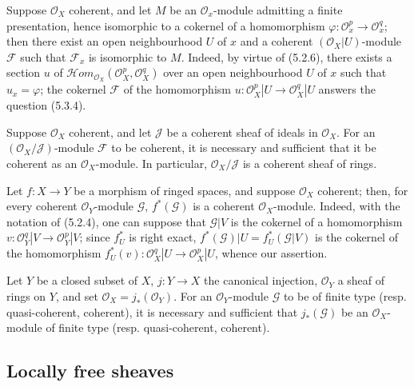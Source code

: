 \begin{env}[5.3.9]
\label{0.5.3.9}
Suppose $\mathcal{O}_X$ coherent, and let $M$ be an $\mathcal{O}_x$-module
admitting a finite presentation, hence isomorphic to a cokernel of a
homomorphism $\varphi:\mathcal{O}_x^p\to\mathcal{O}_x^q$; then there exist an
open neighbourhood $U$ of $x$ and a coherent $(\mathcal{O}_X|U)$-module
$\mathcal{F}$ such that $\mathcal{F}_x$ is isomorphic to $M$. Indeed, by virtue
of (5.2.6), there exists a section $u$ of
$\mathcal{H}\!om_{\mathcal{O}_X}(\mathcal{O}_X^p,\mathcal{O}_X^q)$ over
an open neighbourhood $U$ of $x$ such that $u_x=\varphi$; the cokernel
$\mathcal{F}$ of the homomorphism
$u:\mathcal{O}_X^p|U\to\mathcal{O}_X^q|U$ answers the question (5.3.4).
\end{env}

\begin{env}[5.3.10]
\label{0.5.3.10}
Suppose $\mathcal{O}_X$ coherent, and let $\mathcal{J}$ be a coherent sheaf
of ideals in $\mathcal{O}_X$. For an
$(\mathcal{O}_X/\mathcal{J})$-module $\mathcal{F}$ to be coherent, it is necessary and
sufficient that it be coherent as an $\mathcal{O}_X$-module. In particular,
$\mathcal{O}_X/\mathcal{J}$ is a coherent sheaf of rings.
\end{env}

\begin{env}[5.3.11]
\label{0.5.3.11}
Let $f:X\to Y$ be a morphism of ringed spaces, and suppose
$\mathcal{O}_X$ coherent; then, for every coherent $\mathcal{O}_Y$-module
$\mathcal{G}$, $f^*(\mathcal{G})$ is a coherent $\mathcal{O}_X$-module.
Indeed, with the notation of (5.2.4), one can suppose that $\mathcal{G}|V$ is
the cokernel of a homomorphism
$v:\mathcal{O}_Y^q|V\to\mathcal{O}_Y^p|V$; since $f_U^*$ is right exact,
$f^*(\mathcal{G})|U=f_U^*(\mathcal{G}|V)$ is the cokernel of the homomorphism
$f_U^*(v):\mathcal{O}_X^q|U\to\mathcal{O}_X^p|U$, whence our assertion.
\end{env}

\begin{env}[5.3.12]
\label{0.5.3.12}
Let $Y$ be a closed subset of $X$, $j:Y\to X$ the canonical injection,
$\mathcal{O}_Y$ a sheaf of rings on $Y$, and set
$\mathcal{O}_X=j_*(\mathcal{O}_Y)$. For an $\mathcal{O}_Y$-module
$\mathcal{G}$ to be of finite type (resp. quasi-coherent, coherent), it is necessary and
sufficient that $j_*(\mathcal{G})$ be an $\mathcal{O}_X$-module of finite type
(resp. quasi-coherent, coherent).
\end{env}

\subsection{Locally free sheaves}
\label{subsection:0.5.4}

